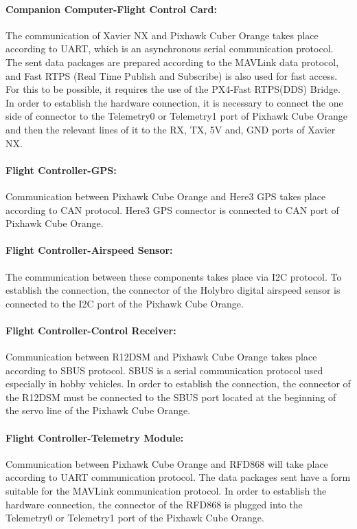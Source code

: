 \documentclass[12pt]{article}
\begin{document}
\paragraph*{Companion Computer-Flight Control Card:} The communication of Xavier NX and Pixhawk Cuber Orange takes place according to UART, which is an asynchronous serial communication protocol. The sent data packages are prepared according to the MAVLink data protocol, and Fast RTPS (Real Time Publish and Subscribe) is also used for fast access. For this to be possible, it requires the use of the PX4-Fast RTPS(DDS) Bridge. In order to establish the hardware connection, it is necessary to connect the one side of connector to the Telemetry0 or Telemetry1 port of Pixhawk Cube Orange and then the relevant lines of it to the RX, TX, 5V and, GND ports of Xavier NX.

\paragraph*{Flight Controller-GPS:} Communication between Pixhawk Cube Orange and Here3 GPS takes place according to CAN protocol. Here3 GPS connector is connected to CAN port of Pixhawk Cube Orange.

\paragraph*{Flight Controller-Airspeed Sensor:} The communication between these components takes place via I2C protocol. To establish the connection, the connector of the Holybro digital airspeed sensor is connected to the I2C port of the Pixhawk Cube Orange.

\paragraph*{Flight Controller-Control Receiver:}Communication between R12DSM and Pixhawk Cube Orange takes place according to SBUS protocol. SBUS is a serial communication protocol used especially in hobby vehicles. In order to establish the connection, the connector of the R12DSM must be connected to the SBUS port located at the beginning of the servo line of the Pixhawk Cube Orange.

\paragraph*{Flight Controller-Telemetry Module:} Communication between Pixhawk Cube Orange and RFD868 will take place according to UART communication protocol. The data packages sent have a form suitable for the MAVLink communication protocol. In order to establish the hardware connection, the connector of the RFD868 is plugged into the Telemetry0 or Telemetry1 port of the Pixhawk Cube Orange. 
\end{document}
